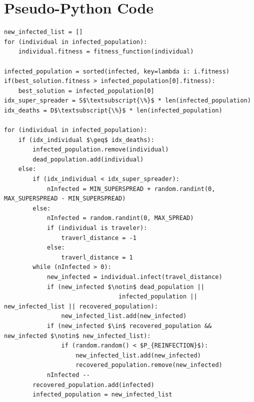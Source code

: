 \documentclass[letterpaper]{article}%
\begin{document}
\section{Pseudo-Python Code}
\lstset{language=Python}
\lstset{frame=lines}
\lstset{basicstyle=\footnotesize}
\lstset{showstringspaces=false}
\lstset{numbers=left}					%
\lstset{stepnumber=1}
\begin{lstlisting}[mathescape=true]
new_infected_list = []
for (individual in infected_population):
    individual.fitness = fitness_function(individual)

infected_population = sorted(infected, key=lambda i: i.fitness)
if(best_solution.fitness > infected_population[0].fitness):
    best_solution = infected_population[0]
idx_super_spreader = S$\textsubscript{\%}$ * len(infected_population)
idx_deaths = D$\textsubscript{\%}$ * len(infected_population)

for (individual in infected_population):
    if (idx_individual $\geq$ idx_deaths):
        infected_population.remove(individual)
        dead_population.add(individual)
    else:
        if (idx_individual < idx_super_spreader):
            nInfected = MIN_SUPERSPREAD + random.randint(0, MAX_SUPERSPREAD - MIN_SUPERSPREAD)
        else:
            nInfected = random.randint(0, MAX_SPREAD)
            if (individual is traveler):
                traverl_distance = -1
            else: 
                traverl_distance = 1
        while (nInfected > 0):
            new_infected = individual.infect(travel_distance)
            if (new_infected $\notin$ dead_population || 
                                infected_population || new_infected_list || recovered_population): 
                new_infected_list.add(new_infected)
            if (new_infected $\in$ recovered_population && new_infected $\notin$ new_infected_list): 
                if (random.random() < $P_{REINFECTION}$): 
                    new_infected_list.add(new_infected)
                    recovered_population.remove(new_infected)
            nInfected --
        recovered_population.add(infected) 
        infected_population = new_infected_list
\end{lstlisting}
\lstset{language=Python}
\lstset{frame=lines}
\lstset{basicstyle=\footnotesize}
\lstset{showstringspaces=false}
\lstset{numbers=left}				
\lstset{stepnumber=1}
\end{document}
